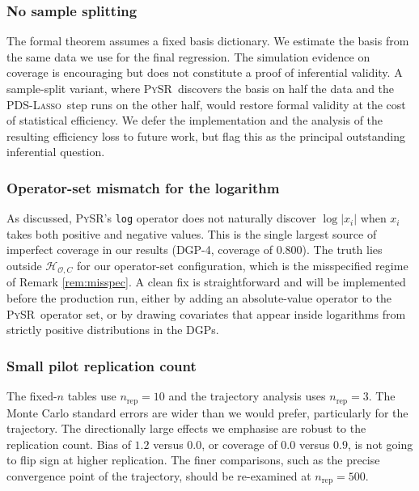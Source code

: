 \documentclass[11pt, a4paper]{article}
\theoremstyle{plain}
\theoremstyle{definition}
\theoremstyle{remark}
\newcommand{\lasso}{\textsc{Lasso}}
\newcommand{\pds}{\textsc{PDS}}
\newcommand{\pysr}{\textsc{PySR}}
\newcommand{\Hcal}{\mathcal{H}_{\mathcal{O}, C}}
\begin{document}
\subsubsection{No sample splitting}

The formal \citet{bch2014} theorem
assumes a fixed basis dictionary. We estimate the basis from the
same data we use for the final regression. The simulation
evidence on coverage is encouraging but does not constitute a
proof of inferential validity. A sample-split variant, where
\pysr\ discovers the basis on half the data and the
\pds-\lasso\ step runs on the other half, would restore formal
validity at the cost of statistical efficiency. We defer the
implementation and the analysis of the resulting efficiency loss
to future work, but flag this as the principal outstanding
inferential question.

\subsubsection{Operator-set mismatch for the logarithm}

As discussed, \pysr's \texttt{log} operator does not naturally discover
$\log|x_i|$ when $x_i$ takes both positive and negative values.
This is the single largest source of imperfect coverage in our
results (DGP-4, coverage of $0.800$). The truth lies outside
$\Hcal$ for our operator-set configuration, which is the
misspecified regime of Remark \ref{rem:misspec}. A clean fix is straightforward and will be implemented before
the production run, either by adding an absolute-value operator
to the \pysr\ operator set, or by drawing covariates that
appear inside logarithms from strictly positive distributions
in the DGPs.

\subsubsection{Small pilot replication count}

The fixed-$n$ tables use
$n_{\text{rep}} = 10$ and the trajectory analysis uses
$n_{\text{rep}} = 3$. The Monte Carlo standard errors are wider
than we would prefer, particularly for the trajectory. The
directionally large effects we emphasise are robust to the
replication count. Bias of $1.2$ versus $0.0$, or coverage of
$0.0$ versus $0.9$, is not going to flip sign at higher
replication. The finer comparisons, such as the precise
convergence point of the trajectory, should be re-examined at
$n_{\text{rep}} = 500$.
\end{document}
